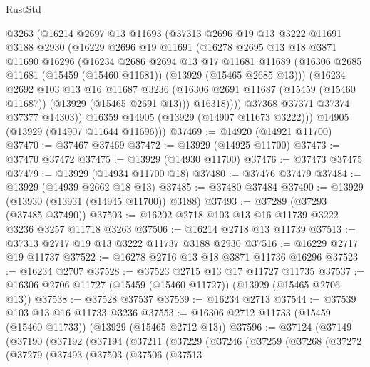 \begin{lexlean}{RustStd}
\begin{coremodule}
        @3263
        (@16214
          @2697
          @13
          @11693
          (@37313
            @2696
            @19
            @13
            @3222
            @11691
            @3188
            @2930
            (@16229
              @2696
              @19
              @11691
              (@16278
                @2695
                @13
                @18
                @3871
                @11690
                @16296
                (@16234
                  @2686
                  @2694
                  @13
                  @17
                  @11681
                  @11689
                  (@16306 @2685 @11681 (@15459 (@15460 @11681)) (@13929 (@15465 @2685 @13)))
                  (@16234
                    @2692
                    @103
                    @13
                    @16
                    @11687
                    @3236
                    (@16306 @2691 @11687 (@15459 (@15460 @11687)) (@13929 (@15465 @2691 @13)))
                    @16318))))
            @37368
            @37371
            @37374
            @37377
            @14303))
        @16359
        @14905
        (@13929 (@14907 @11673 @3222)))
      @14905
      (@13929 (@14907 @11644 @11696)))
@37469 := @14920 (@14921 @11700)
@37470 := @37467 @37469
@37472 := @13929 (@14925 @11700)
@37473 := @37470 @37472
@37475 := @13929 (@14930 @11700)
@37476 := @37473 @37475
@37479 := @13929 (@14934 @11700 @18)
@37480 := @37476 @37479
@37484 := @13929 (@14939 @2662 @18 @13)
@37485 := @37480 @37484
@37490 := @13929 (@13930 (@13931 (@14945 @11700)) @3188)
@37493 := @37289 (@37293 (@37485 @37490))
@37503 := @16202 @2718 @103 @13 @16 @11739 @3222 @3236 @3257 @11718 @3263
@37506 := @16214 @2718 @13 @11739
@37513 := @37313 @2717 @19 @13 @3222 @11737 @3188 @2930
@37516 := @16229 @2717 @19 @11737
@37522 := @16278 @2716 @13 @18 @3871 @11736 @16296
@37523 := @16234 @2707
@37528 := @37523 @2715 @13 @17 @11727 @11735
@37537 := @16306 @2706 @11727 (@15459 (@15460 @11727)) (@13929 (@15465 @2706 @13))
@37538 := @37528 @37537
@37539 := @16234 @2713
@37544 := @37539 @103 @13 @16 @11733 @3236
@37553 := @16306 @2712 @11733 (@15459 (@15460 @11733)) (@13929 (@15465 @2712 @13))
@37596 := @37124
    (@37149
      (@37190
        (@37192
          (@37194
            (@37211
              (@37229
                (@37246
                  (@37259
                    (@37268
                      (@37272
                        (@37279
                          (@37493
                            (@37503
                              (@37506
                                (@37513

\end{coremodule}
\end{lexlean}
